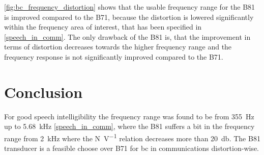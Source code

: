 \autoref{fig:bc_frequency_distortion} shows that the usable frequency range for the B81 is improved compared to the B71, because the distortion is lowered significantly within the frequency area of interest, that has been specified in \autoref{speech_in_comm}. The only drawback of the B81 is, that the improvement in terms of distortion decreases towards the higher frequency range and the frequency response is not significantly improved compared to the B71. 


\section{Conclusion}

For good speech intelligibility the frequency range was found to be from \SI{355}{\hertz} up to \SI{5.68}{\kilo\hertz}  \autoref{speech_in_comm}, where the B81 suffers a bit in the frequency range from \SI{2}{\kilo\hertz} where the \si{\newton\per\volt} relation decreases more than \SI{20}{\decibel}.  The B81 transducer is a feasible choose over B71 for \gls{bc} in communications distortion-wise.







